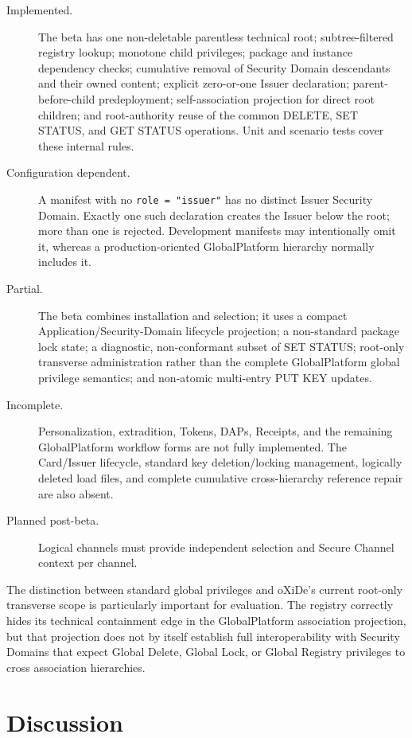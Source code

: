 \begin{description}
\item[Implemented.] The beta has one non-deletable parentless technical root;
  subtree-filtered registry lookup; monotone child privileges; package and
  instance dependency checks; cumulative removal of Security Domain
  descendants and their owned content; explicit zero-or-one Issuer declaration;
  parent-before-child predeployment; self-association projection for direct
  root children; and root-authority reuse of the common DELETE, SET STATUS, and
  GET STATUS operations. Unit and scenario tests cover these internal rules.
\item[Configuration dependent.] A manifest with no \texttt{role = "issuer"}
  has no distinct Issuer Security Domain. Exactly one such declaration creates
  the Issuer below the root; more than one is rejected. Development manifests
  may intentionally omit it, whereas a production-oriented GlobalPlatform
  hierarchy normally includes it.
\item[Partial.] The beta combines installation and selection; it uses a compact
  Application/Security-Domain lifecycle projection; a non-standard package
  lock state; a diagnostic, non-conformant subset of SET STATUS; root-only
  transverse administration rather than the complete GlobalPlatform global
  privilege semantics; and non-atomic multi-entry PUT KEY updates.
\item[Incomplete.] Personalization, extradition, Tokens, DAPs, Receipts, and
  the remaining GlobalPlatform workflow forms are not fully implemented. The
  Card/Issuer lifecycle, standard key deletion/locking management, logically
  deleted load files, and complete cumulative cross-hierarchy reference repair
  are also absent.
\item[Planned post-beta.] Logical channels must provide independent selection
  and Secure Channel context per channel.
\end{description}

The distinction between standard global privileges and oXiDe's current
root-only transverse scope is particularly important for evaluation. The
registry correctly hides its technical containment edge in the GlobalPlatform
association projection, but that projection does not by itself establish full
interoperability with Security Domains that expect Global Delete, Global Lock,
or Global Registry privileges to cross association hierarchies.

\section{Discussion}

